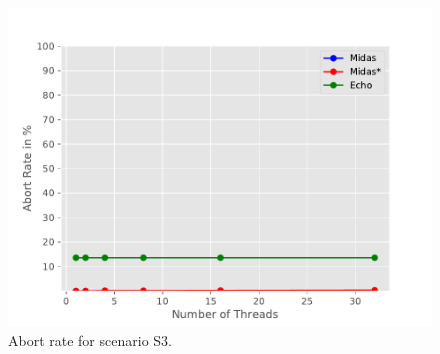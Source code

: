 \begin{figure}[h!]
\begin{minipage}[l]{0.50\textwidth}
    \label{fig:eff-s3}
\end{minipage}
\begin{minipage}[l]{0.50\textwidth}
    \includegraphics[width=\textwidth]{figures/bench/ar-ls}
    \caption{Abort rate for scenario S3.}
    \label{fig:ar-s3}
\end{minipage}
\end{figure}


